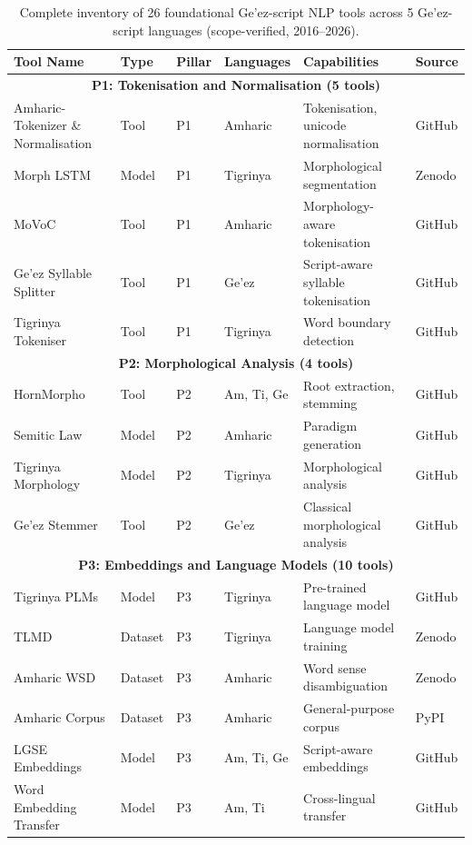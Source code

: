 \documentclass[12pt,a4paper]{article}
\theoremstyle{plain}
\theoremstyle{definition}
\begin{document}
\begin{table}[ht]
\centering
\caption{Complete inventory of 26 foundational Ge'ez-script NLP tools across 5 Ge'ez-script languages (scope-verified, 2016--2026).}
\label{table:inventory}
\small
\begin{tabularx}{\textwidth}{|l|l|l|p{2cm}|p{2.5cm}|l|}
\hline
\textbf{Tool Name} & \textbf{Type} & \textbf{Pillar} & \textbf{Languages} & \textbf{Capabilities} & \textbf{Source} \\
\hline
\multicolumn{6}{|c|}{\textbf{P1: Tokenisation and Normalisation (5 tools)}} \\
\hline
Amharic-Tokenizer \& Normalisation & Tool & P1 & Amharic & Tokenisation, unicode normalisation & GitHub \\
Morph LSTM & Model & P1 & Tigrinya & Morphological segmentation & Zenodo \\
MoVoC & Tool & P1 & Amharic & Morphology-aware tokenisation & GitHub \\
Ge'ez Syllable Splitter & Tool & P1 & Ge'ez & Script-aware syllable tokenisation & GitHub \\
Tigrinya Tokeniser & Tool & P1 & Tigrinya & Word boundary detection & GitHub \\
\hline
\multicolumn{6}{|c|}{\textbf{P2: Morphological Analysis (4 tools)}} \\
\hline
HornMorpho & Tool & P2 & Am, Ti, Ge & Root extraction, stemming & GitHub \\
Semitic Law & Model & P2 & Amharic & Paradigm generation & GitHub \\
Tigrinya Morphology & Model & P2 & Tigrinya & Morphological analysis & GitHub \\
Ge'ez Stemmer & Tool & P2 & Ge'ez & Classical morphological analysis & GitHub \\
\hline
\multicolumn{6}{|c|}{\textbf{P3: Embeddings and Language Models (10 tools)}} \\
\hline
Tigrinya PLMs & Model & P3 & Tigrinya & Pre-trained language model & GitHub \\
TLMD & Dataset & P3 & Tigrinya & Language model training & Zenodo \\
Amharic WSD & Dataset & P3 & Amharic & Word sense disambiguation & Zenodo \\
Amharic Corpus & Dataset & P3 & Amharic & General-purpose corpus & PyPI \\
LGSE Embeddings & Model & P3 & Am, Ti, Ge & Script-aware embeddings & GitHub \\
Word Embedding Transfer & Model & P3 & Am, Ti & Cross-lingual transfer & GitHub \\

\end{tabularx}
\end{table}
\end{document}
